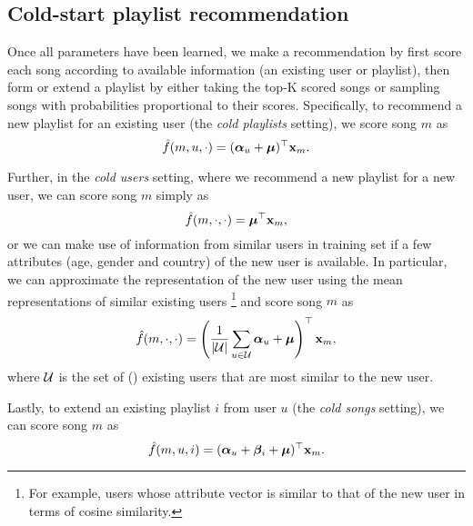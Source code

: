 \subsection{Cold-start playlist recommendation}

Once all parameters have been learned, 
we make a recommendation by first score each song according to available information (\eg an existing user or playlist),
then form or extend a playlist by either taking the top-K scored songs or sampling songs with probabilities proportional to their scores.
Specifically, to recommend a new playlist for an existing user (\ie the \emph{cold playlists} setting),
we score song $m$ as 
$$
\hat f(m, u, \cdot) = ({\bm{\alpha}}_u + \bm{\mu})^\top \mathbf{x}_m.
$$

Further, in the \emph{cold users} setting, where we recommend a new playlist for a new user,
we can score song $m$ simply as
$$
\hat f(m, \cdot, \cdot) = \bm{\mu}^\top \mathbf{x}_m,
$$
or we can make use of information from similar users in training set if a few attributes 
(\eg age, gender and country) of the new user is available.
In particular, we can approximate the representation of the new user using the mean representations of similar existing users
\footnote{For example, users whose attribute vector is similar to that of the new user in terms of cosine similarity.} 
and score song $m$ as
$$
\hat f(m, \cdot, \cdot) = \left( \frac{1}{|\mathcal{U}|} \sum_{u \in \mathcal{U}} {\bm{\alpha}}_u + \bm{\mu} \right)^\top \mathbf{x}_m,
$$
where $\mathcal{U}$ is the set of () existing users that are most similar to the new user.

Lastly, to extend an existing playlist $i$ from user $u$ (\ie the \emph{cold songs} setting),
we can score song $m$ as
$$
\hat f(m, u, i) = ({\bm{\alpha}}_u + {\bm{\beta}}_i + \bm{\mu})^\top \mathbf{x}_m.
$$




